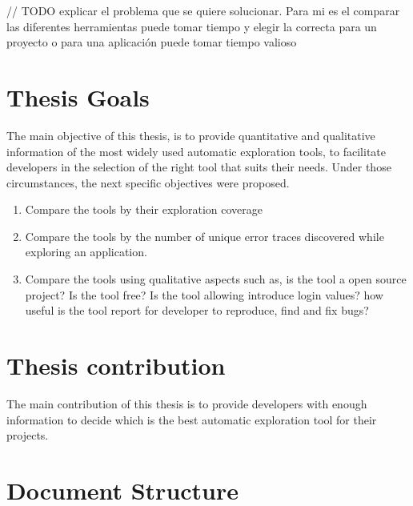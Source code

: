 // TODO explicar el problema que se quiere solucionar. Para mi es el comparar las diferentes herramientas puede tomar tiempo y elegir la correcta para un proyecto o para una aplicación puede tomar tiempo valioso


\section{Thesis  Goals}

The main objective of this thesis, is to provide quantitative and qualitative information of the most widely used automatic exploration tools, to facilitate developers in the selection of the right tool that suits their needs. Under those circumstances, the next specific objectives were proposed.
		\begin{enumerate}
			\item Compare the tools by their exploration coverage 
			\item Compare the tools by the number of unique error traces discovered while exploring an application.
			\item Compare the tools using qualitative aspects such as, is the tool a open source project? Is the tool free? Is the tool allowing introduce login values? how useful is the tool report for developer to reproduce, find and fix bugs?
		\end{enumerate}




\section{Thesis contribution}

The main contribution of this thesis is to provide developers with enough information to decide which is the best automatic exploration tool for their projects.



	
\section{Document Structure}


